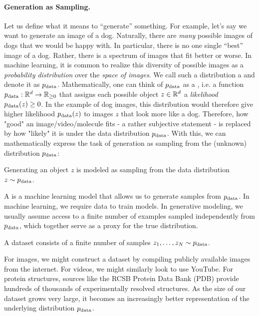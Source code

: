 \paragraph{Generation as Sampling.}Let us define what it means to ``generate'' something. For example, let's say we want to generate an image of a dog. Naturally, there are \emph{many} possible images of dogs that we would be happy with. In particular, there is no one single ``best'' image of a dog. Rather, there is a spectrum of images that fit better or worse. In machine learning, it is common to realize this diversity of possible images as a \emph{probability distribution} over the \emph{space of images}. We call such a distribution a  and denote it as $p_{\rm{data}}$. Mathematically, one can think of $p_{\rm{data}}$ as a , i.e. a function $p_{\rm{data}}:\mathbb{R}^d\to\mathbb{R}_{\geq 0}$ that assigns each possible object $z\in \mathbb{R}^d$ a \emph{likelihood} $p_{\rm{data}}(z)\geq 0$. In the example of dog images, this distribution would therefore give higher likelihood $p_{\rm{data}}(z)$ to images $z$ that look more like a dog. Therefore, how "good" an image/video/molecule fits - a rather subjective statement - is replaced by how "likely" it is under the data distribution $p_{\rm{data}}$. With this, we can mathematically express the task of generation as sampling from the (unknown) distribution $p_{\rm{data}}$:
\begin{ideabox}
    Generating an object $z$ is modeled as sampling from the data distribution $z\sim p_{\rm{data}}$.
\end{ideabox}
A  is a machine learning model that allows us to generate samples from $p_{\rm{data}}$. In machine learning, we require data to train models. In generative modeling, we usually assume access to a finite number of examples sampled independently from $p_{\rm{data}}$, which together serve as a proxy for the true distribution.
\begin{ideabox}[Dataset]
    A dataset consists of a finite number of samples $z_1, \dots, z_N \sim p_{\rm{data}}$.
\end{ideabox}
For images, we might construct a dataset by compiling publicly available images from the internet. For videos, we might similarly look to use YouTube. For protein structures, sources like the RCSB Protein Data Bank (PDB) provide hundreds of thousands of experimentally resolved structures. As the size of our dataset grows very large, it becomes an increasingly better representation of the underlying distribution $p_{\rm{data}}$.

